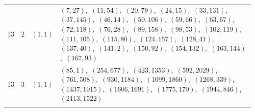 \documentclass[11pt]{article}
\begin{document}
\begin{longtable}{@{}rrl>{\raggedright\arraybackslash}p{}@{}}
13 & 2 & $(1,1)$ & $(7,27)$,\allowbreak\ $(11,54)$,\allowbreak\ $(20,79)$,\allowbreak\ $(24,15)$,\allowbreak\ $(33,131)$,\allowbreak\ $(37,145)$,\allowbreak\ $(46,14)$,\allowbreak\ $(50,106)$,\allowbreak\ $(59,66)$,\allowbreak\ $(63,67)$,\allowbreak\ $(72,118)$,\allowbreak\ $(76,28)$,\allowbreak\ $(89,158)$,\allowbreak\ $(98,53)$,\allowbreak\ $(102,119)$,\allowbreak\ $(111,105)$,\allowbreak\ $(115,80)$,\allowbreak\ $(124,157)$,\allowbreak\ $(128,41)$,\allowbreak\ $(137,40)$,\allowbreak\ $(141,2)$,\allowbreak\ $(150,92)$,\allowbreak\ $(154,132)$,\allowbreak\ $(163,144)$,\allowbreak\ $(167,93)$\\
13 & 3 & $(1,1)$ & $(85,1)$,\allowbreak\ $(254,677)$,\allowbreak\ $(423,1353)$,\allowbreak\ $(592,2029)$,\allowbreak\ $(761,508)$,\allowbreak\ $(930,1184)$,\allowbreak\ $(1099,1860)$,\allowbreak\ $(1268,339)$,\allowbreak\ $(1437,1015)$,\allowbreak\ $(1606,1691)$,\allowbreak\ $(1775,170)$,\allowbreak\ $(1944,846)$,\allowbreak\ $(2113,1522)$\\
\addlinespace[3pt]
\end{longtable}
\endgroup
\end{document}
